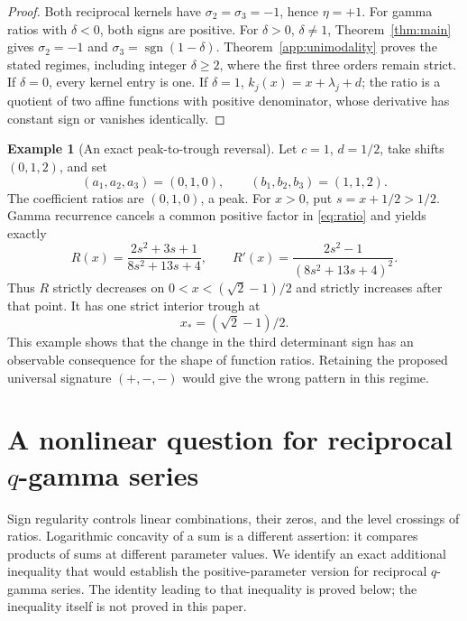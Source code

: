 \documentclass[11pt,a4paper]{article}
\theoremstyle{definition}
\newtheorem{example}[theorem]{Example}
\theoremstyle{remark}
\DeclareMathOperator{\sgn}{sgn}
\begin{document}
\begin{proof}
Both reciprocal kernels have \(\sigma_2=\sigma_3=-1\), hence
\(\eta=+1\). For gamma ratios with \(\delta<0\), both signs are
positive. For \(\delta>0\), \(\delta\ne1\), Theorem~\ref{thm:main}
gives \(\sigma_2=-1\) and \(\sigma_3=\sgn(1-\delta)\).
Theorem~\ref{app:unimodality} proves the stated regimes, including
integer \(\delta\ge2\), where the first three orders remain strict.
If \(\delta=0\), every kernel entry is one. If \(\delta=1\),
\(k_j(x)=x+\lambda_j+d\); the ratio is a quotient of two affine
functions with positive denominator, whose derivative has constant
sign or vanishes identically.
\end{proof}

\begin{example}[An exact peak-to-trough reversal]\label{ex:trough}
Let \(c=1\), \(d=1/2\), take shifts \((0,1,2)\), and set
\[
 (a_1,a_2,a_3)=(0,1,0),\qquad
 (b_1,b_2,b_3)=(1,1,2).
\]
The coefficient ratios are \((0,1,0)\), a peak. For \(x>0\), put
\(s=x+1/2>1/2\). Gamma recurrence cancels a common positive factor
in \eqref{eq:ratio} and yields exactly
\begin{equation}\label{eq:trough-formula}
 R(x)=\frac{2s^2+3s+1}{8s^2+13s+4},\qquad
 R'(x)=\frac{2s^2-1}{(8s^2+13s+4)^2}.
\end{equation}
Thus \(R\) strictly decreases on
\(0<x<(\sqrt2-1)/2\) and strictly increases after that point.
It has one strict interior trough at
\[
 x_*=(\sqrt2-1)/2.
\]
This example shows that the change in the third determinant sign has
an observable consequence for the shape of function ratios. Retaining
the proposed universal signature \((+,-,-)\) would give the wrong
pattern in this regime.
\end{example}

\section{A nonlinear question for reciprocal \texorpdfstring{\(q\)}{q}-gamma series}
\label{ob:nonlinear}

Sign regularity controls linear combinations, their zeros, and the level
crossings of ratios. Logarithmic concavity of a sum is a different
assertion: it compares products of sums at different parameter values.
We identify an exact additional inequality that would establish the
positive-parameter version for reciprocal \(q\)-gamma series. The
identity leading to that inequality is proved below; the inequality
itself is not proved in this paper.
\end{document}
